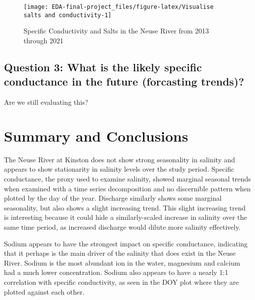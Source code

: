 \documentclass[
  12pt,
]{article}
\begin{document}
\begin{figure}

\texttt{[image: EDA-final-project\_files/figure-latex/Visualise salts and conductivity-1]} \hfill{}

\caption{Specific Conductivity and Salts in the Neuse River from 2013 through 2021}\label{fig:Visualise salts and conductivity}
\end{figure}

\hypertarget{question-3-what-is-the-likely-specific-conductance-in-the-future-forcasting-trends}{%
\subsection{Question 3: What is the likely specific conductance in the
future (forcasting
trends)?}\label{question-3-what-is-the-likely-specific-conductance-in-the-future-forcasting-trends}}

Are we still evaluating this?

\newpage

\hypertarget{summary-and-conclusions}{%
\section{Summary and Conclusions}\label{summary-and-conclusions}}

The Neuse River at Kinston does not show strong seasonality in salinity
and appears to show stationarity in salinity levels over the study
period. Specific conductance, the proxy used to examine salinity, showed
marginal seasonal trends when examined with a time series decomposition
and no discernible pattern when plotted by the day of the year.
Discharge similarly shows some marginal seasonality, but also shows a
slight increasing trend. This slight increasing trend is interesting
because it could hide a similarly-scaled increase in salinity over the
same time period, as increased discharge would dilute more salinity
effectively.

Sodium appears to have the strongest impact on specific conductance,
indicating that it perhaps is the main driver of the salinity that does
exist in the Neuse River. Sodium is the most abundant ion in the water,
magnesium and calcium had a much lower concentration. Sodium also
appears to have a nearly 1:1 correlation with specific conductivity, as
seen in the DOY plot where they are plotted against each other.
\end{document}
